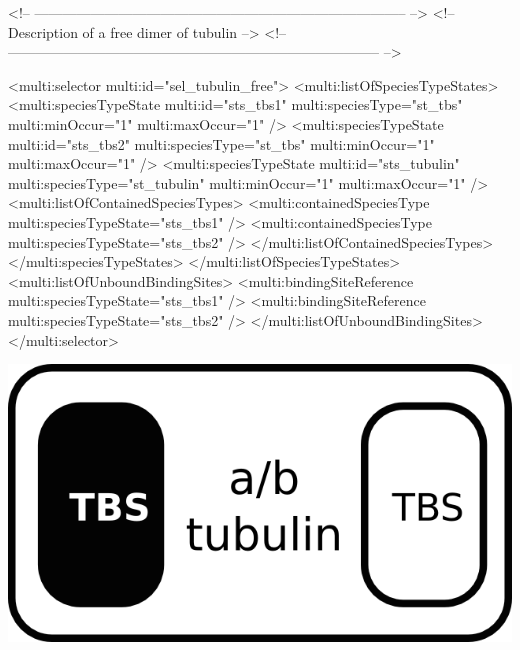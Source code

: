 \begin{example}
<!-- -------------------------------------------------------------------------------- -->
<!-- Description of a free dimer of tubulin                                           -->
<!-- -------------------------------------------------------------------------------- -->
    
      <multi:selector multi:id="sel_tubulin_free">
        <multi:listOfSpeciesTypeStates>
          <multi:speciesTypeState multi:id="sts_tbs1" multi:speciesType="st_tbs" 
                                   multi:minOccur="1" multi:maxOccur="1" />
          <multi:speciesTypeState multi:id="sts_tbs2" multi:speciesType="st_tbs" 
                                   multi:minOccur="1" multi:maxOccur="1" />
          <multi:speciesTypeState multi:id="sts_tubulin" multi:speciesType="st_tubulin" 
                                   multi:minOccur="1" multi:maxOccur="1" />
            <multi:listOfContainedSpeciesTypes>
              <multi:containedSpeciesType multi:speciesTypeState="sts_tbs1" /> 
              <multi:containedSpeciesType multi:speciesTypeState="sts_tbs2" />
            </multi:listOfContainedSpeciesTypes>
          </multi:speciesTypeStates>
        </multi:listOfSpeciesTypeStates>
        <multi:listOfUnboundBindingSites>
          <multi:bindingSiteReference multi:speciesTypeState="sts_tbs1" />
          <multi:bindingSiteReference multi:speciesTypeState="sts_tbs2" />
        </multi:listOfUnboundBindingSites>
      </multi:selector>
\end{example}

\includegraphics{figs/pngs/sel_microtubule.png}

